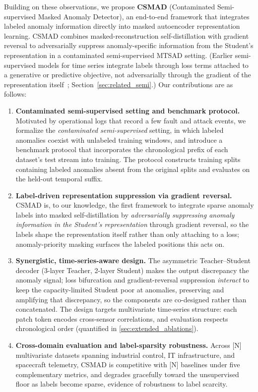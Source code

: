 Building on these observations, we propose \textbf{CSMAD} (Contaminated Semi-supervised Masked Anomaly Detector), an end-to-end framework that integrates labeled anomaly information directly into masked autoencoder representation learning.
CSMAD combines masked-reconstruction self-distillation with gradient reversal to adversarially suppress anomaly-specific information from the Student's representation in a contaminated semi-supervised MTSAD setting.
(Earlier semi-supervised models for time series integrate labels through loss terms attached to a generative or predictive objective, not adversarially through the gradient of the representation itself~\cite{xue2022fewpositive,huang2022slavae}; Section~\ref{sec:related_semi}.)
Our contributions are as follows:

\begin{enumerate}
  \item \textbf{Contaminated semi-supervised setting and benchmark protocol.}
    Motivated by operational logs that record a few fault and attack events, we formalize the \emph{contaminated semi-supervised} setting, in which labeled anomalies coexist with unlabeled training windows, and introduce a benchmark protocol that incorporates the chronological prefix of each dataset's test stream into training.
    The protocol constructs training splits containing labeled anomalies absent from the original splits and evaluates on the held-out temporal suffix.

  \item \textbf{Label-driven representation suppression via gradient reversal.}
    CSMAD is, to our knowledge, the first framework to integrate sparse anomaly labels into masked self-distillation by \emph{adversarially suppressing anomaly information in the Student's representation} through gradient reversal, so the labels shape the representation itself rather than only attaching to a loss; anomaly-priority masking surfaces the labeled positions this acts on.

  \item \textbf{Synergistic, time-series-aware design.}
    The asymmetric Teacher--Student decoder (3-layer Teacher, 2-layer Student) makes the output discrepancy the anomaly signal; loss bifurcation and gradient-reversal suppression \emph{interact} to keep the capacity-limited Student poor at anomalies, preserving and amplifying that discrepancy, so the components are co-designed rather than concatenated.
    The design targets multivariate time-series structure: each patch token encodes cross-sensor correlations, and evaluation respects chronological order (quantified in \ref{sec:extended_ablations}).

  \item \textbf{Cross-domain evaluation and label-sparsity robustness.}
    Across [N] multivariate datasets spanning industrial control, IT infrastructure, and spacecraft telemetry, CSMAD is competitive with [N] baselines under five complementary metrics, and degrades gracefully toward the unsupervised floor as labels become sparse, evidence of robustness to label scarcity.
\end{enumerate}


\BodyFloatBarrier
